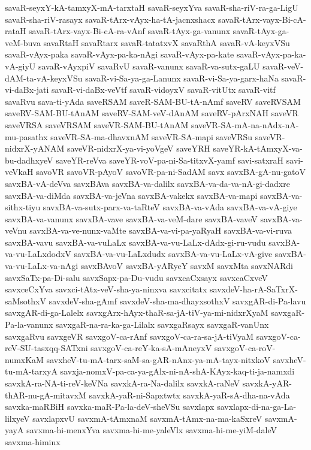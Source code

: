 {savaR-seyxY-kA-tamxyX-mA-tarxtaH
savaR-seyxYva
savaR-sha-riV-ra-ga-LigU
savaR-sha-riV-rasayx
savaR-tArx-vAyx-ha-tA-jacnxshacx
savaR-tArx-vayx-Bi-cA-rataH
savaR-tArx-vayx-Bi-cA-ra-vAnf
savaR-tAyx-ga-vanunx
savaR-tAyx-ga-veM-buva
savaRtaH
savaRtarx
savaR-tatatxvX
savaRthA
savaR-vA-keyxVSu
savaR-vAyx-paka
savaR-vAyx-pa-ka-nAgi
savaR-vAyx-pa-kate
savaR-vAyx-pa-ka-vA-giyU
savaR-vAyxpiV
savaRvU
savaR-vanunx
savaR-va-sutx-gaLU
savaR-veV-dAM-ta-vA-keyxVSu
savaR-vi-Sa-ya-ga-Lanunx
savaR-vi-Sa-ya-garx-haNa
savaR-vi-daBx-jati
savaR-vi-daBx-veVtf
savaR-vidoyxV
savaR-vitUtx
savaR-vitf
savaRvu
sava-ti-yAda
saveRSAM
saveR-SAM-BU-tA-nAmf
saveRV
saveRVSAM
saveRV-SAM-BU-tAnAM
saveRV-SAM-veV-dAnAM
saveRV-pArxNAH
saveVR
saveVRSA
saveVRSAM
saveVR-SAM-BU-tAnAM
saveVR-SA-mA-na-nAdx-nA-mu-pasathx
saveVR-SA-ma-dhavxnAM
saveVR-SA-mapi
saveVRSu
saveVR-nidxrX-yANAM
saveVR-nidxrX-ya-vi-yoVgeV
saveYRH
saveYR-kA-tAmxyX-va-bu-dadhxyeV
saveYR-reVva
saveYR-voV-pa-ni-Sa-titxvX-yamf
savi-satxraH
savi-veVkaH
savoVR
savoVR-pAyoV
savoVR-pa-ni-SadAM
savx
savxBA-gA-nu-gatoV
savxBA-vA-deVva
savxBAva
savxBA-va-dalilx
savxBA-va-da-va-nA-gi-dadxre
savxBA-va-diMda
savxBA-va-jeVna
savxBA-vakekx
savxBA-va-mapi
savxBA-va-sithx-tiyu
savxBA-va-sutx-parx-va-taRteV
savxBA-va-vAda
savxBA-va-vA-giye
savxBA-va-vanunx
savxBA-vave
savxBA-va-veM-dare
savxBA-vaveV
savxBA-va-veVnu
savxBA-va-ve-nunx-vaMte
savxBA-va-vi-pa-yaRyaH
savxBA-va-vi-ruva
savxBA-vavu
savxBA-va-vuLaLx
savxBA-va-vu-LaLx-dAdx-gi-ru-vudu
savxBA-va-vu-LaLxdodxV
savxBA-va-vu-LaLxdudx
savxBA-va-vu-LaLx-vA-give
savxBA-va-vu-LaLx-va-nAgi
savxBAvoV
savxBA-yARyeY
savxM
savxMta
savxNARdi
savxSaTx-pa-Di-salu
savxSapx-pa-Du-vudu
savxcaCxsayx
savxcaCxveV
savxceCxYva
savxci-tAtx-veV-sha-ya-ninxva
savxcitatx
savxdeV-ha-rA-SaTxrX-saMsothxV
savxdeV-sha-gAmf
savxdeV-sha-ma-dhayxsothxV
savxgAR-di-Pa-lavu
savxgAR-di-ga-Lalelx
savxgArx-hAyx-thaR-sa-jA-tiV-ya-mi-nidxrXyaM
savxgaR-Pa-la-vanunx
savxgaR-na-ra-ka-ga-Lilalx
savxgaRsayx
savxgaR-vanUnx
savxgaRvu
savxgeVR
savxgoV-ca-rAnf
savxgoV-ca-ra-sa-jA-tiVyaM
savxgoV-ca-reV-SU-tasxqq-SATxni
savxgoV-ca-reY-ka-sA-mAneyxV
savxgoV-ca-roV-numxKaM
savxheV-tu-mA-tarx-saM-sa-gAR-nAnx-ya-mA-tayx-nitxkoV
savxheV-tu-mA-tarxyA
savxja-nomxV-pa-ca-ya-gAlx-ni-nA-shA-KAyx-kaq-ti-ja-namxdi
savxkA-ra-NA-ti-reV-keVNa
savxkA-ra-Na-dalilx
savxkA-raNeV
savxkA-yAR-thAR-nu-gA-mitavxM
savxkA-yaR-ni-Sapxtwtx
savxkA-yaR-sA-dha-na-vAda
savxka-maRBiH
savxka-maR-Pa-la-deV-sheVSu
savxlapx
savxlapx-di-na-ga-La-lilxyeV
savxlapxvU
savxmA-tAmxnaM
savxmA-tAmx-na-ma-kaSxreV
savxmA-yayA
savxma-hi-menxYva
savxma-hi-me-yaleVlx
savxma-hi-me-yiM-daleV
savxma-himinx
}
